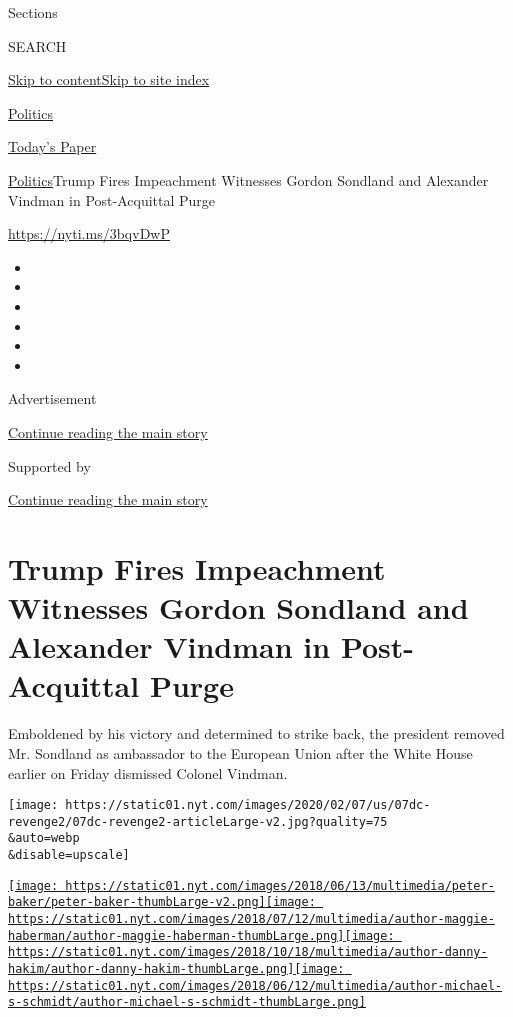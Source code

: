 Sections

SEARCH

\protect\hyperlink{site-content}{Skip to
content}\protect\hyperlink{site-index}{Skip to site index}

\href{https://www.nytimes.com/section/politics}{Politics}

\href{https://myaccount.nytimes.com/auth/login?response_type=cookie\&client_id=vi}{}

\href{https://www.nytimes.com/section/todayspaper}{Today's Paper}

\href{/section/politics}{Politics}\textbar{}Trump Fires Impeachment
Witnesses Gordon Sondland and Alexander Vindman in Post-Acquittal Purge

\url{https://nyti.ms/3bqvDwP}

\begin{itemize}
\item
\item
\item
\item
\item
\item
\end{itemize}

Advertisement

\protect\hyperlink{after-top}{Continue reading the main story}

Supported by

\protect\hyperlink{after-sponsor}{Continue reading the main story}

\hypertarget{trump-fires-impeachment-witnesses-gordon-sondland-and-alexander-vindman-in-post-acquittal-purge}{%
\section{Trump Fires Impeachment Witnesses Gordon Sondland and Alexander
Vindman in Post-Acquittal
Purge}\label{trump-fires-impeachment-witnesses-gordon-sondland-and-alexander-vindman-in-post-acquittal-purge}}

Emboldened by his victory and determined to strike back, the president
removed Mr. Sondland as ambassador to the European Union after the White
House earlier on Friday dismissed Colonel Vindman.

\texttt{[image: https://static01.nyt.com/images/2020/02/07/us/07dc-revenge2/07dc-revenge2-articleLarge-v2.jpg?quality=75\\\&auto=webp\\\&disable=upscale]}

\href{https://www.nytimes.com/by/peter-baker}{\texttt{[image: https://static01.nyt.com/images/2018/06/13/multimedia/peter-baker/peter-baker-thumbLarge-v2.png]}}\href{https://www.nytimes.com/by/maggie-haberman}{\texttt{[image: https://static01.nyt.com/images/2018/07/12/multimedia/author-maggie-haberman/author-maggie-haberman-thumbLarge.png]}}\href{https://www.nytimes.com/by/danny-hakim}{\texttt{[image: https://static01.nyt.com/images/2018/10/18/multimedia/author-danny-hakim/author-danny-hakim-thumbLarge.png]}}\href{https://www.nytimes.com/by/michael-s-schmidt}{\texttt{[image: https://static01.nyt.com/images/2018/06/12/multimedia/author-michael-s-schmidt/author-michael-s-schmidt-thumbLarge.png]}}

